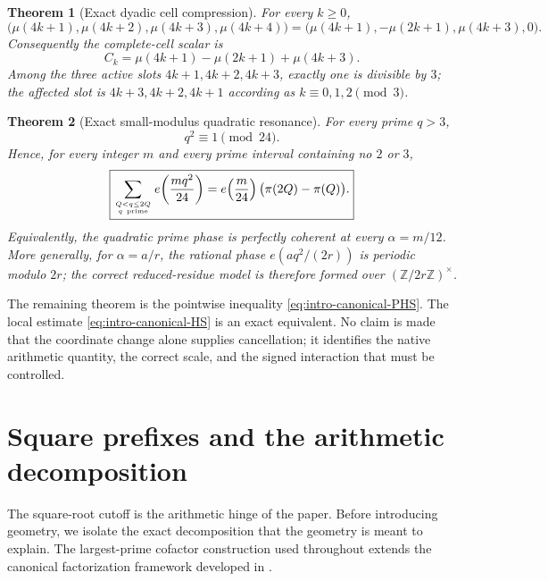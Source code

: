\documentclass[11pt]{article}
\newtheorem{theorem}{Theorem}[section]
\theoremstyle{definition}
\newcommand{\1}{\mathbf{1}}
\begin{document}
\begin{theorem}[Exact dyadic cell compression]
\label{thm:intro-dyadic-cell}
For every $k\ge0$,
\[
 \boxed{
 \bigl(\mu(4k+1),\mu(4k+2),\mu(4k+3),\mu(4k+4)\bigr)
 =\bigl(\mu(4k+1),-\mu(2k+1),\mu(4k+3),0\bigr).
 }
\]
Consequently the complete-cell scalar is
\[
 \boxed{C_k=\mu(4k+1)-\mu(2k+1)+\mu(4k+3).}
\]
Among the three active slots $4k+1,4k+2,4k+3$, exactly one is divisible by $3$; the affected slot is $4k+3,4k+2,4k+1$ according as $k\equiv0,1,2\pmod3$.
\end{theorem}

\begin{theorem}[Exact small-modulus quadratic resonance]
\label{thm:intro-prime-square-24}
For every prime $q>3$,
\[
 \boxed{q^2\equiv1\pmod{24}.}
\]
Hence, for every integer $m$ and every prime interval containing no $2$ or $3$,
\[
 \boxed{
 \sum_{Q<q\le2Q\atop q\ {\rm prime}}
 e\!\left(\frac{m q^2}{24}\right)
 =e\!\left(\frac m{24}\right)
 \bigl(\pi(2Q)-\pi(Q)\bigr).
 }
\]
Equivalently, the quadratic prime phase is perfectly coherent at every
$\alpha=m/12$.  More generally, for $\alpha=a/r$, the rational phase
$e(aq^2/(2r))$ is periodic modulo $2r$; the correct reduced-residue model is therefore formed over $(\mathbb Z/2r\mathbb Z)^\times$.
\end{theorem}

The remaining theorem is the pointwise inequality \eqref{eq:intro-canonical-PHS}.  The local estimate \eqref{eq:intro-canonical-HS} is an exact equivalent.  No claim is made that the coordinate change alone supplies cancellation; it identifies the native arithmetic quantity, the correct scale, and the signed interaction that must be controlled.


\section{Square prefixes and the arithmetic decomposition}
\label{sec:arithmetic}

The square-root cutoff is the arithmetic hinge of the paper.  Before introducing geometry, we isolate the exact decomposition that the geometry is meant to explain.  The largest-prime cofactor construction used throughout extends the canonical factorization framework developed in \cite{viole-complex}.
\end{document}
